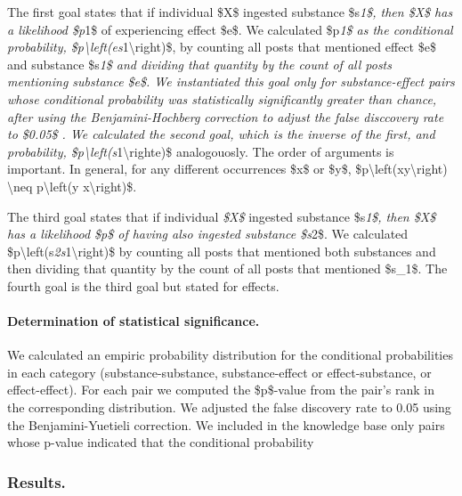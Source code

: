 \documentclass[
]{article}
\begin{document}
The first goal states that if individual \$X\$ ingested substance
\$s\emph{1\$, then \$X\$ has a likelihood \$p}1\$ of experiencing effect
\$e\$. We calculated \$p\emph{1\$ as the conditional probability,
\$p\textbackslash left(e\textbar s}1\textbackslash right)\$, by counting
all posts that mentioned effect \$e\$ and substance \$s\emph{1\$ and
dividing that quantity by the count of all posts mentioning substance
\$e\$. We instantiated this goal only for substance-effect pairs whose
conditional probability was statistically significantly greater than
chance, after using the Benjamini-Hochberg correction to adjust the
false disccovery rate to \$0.05\$ . We calculated the second goal, which
is the inverse of the first, and probability,
\$p\textbackslash left(s}1\textbackslash right\textbar e)\$
analogouosly. The order of arguments is important. In general, for any
different occurrences \$x\$ or \$y\$,
\$p\textbackslash left(x\textbar y\textbackslash right)
\textbackslash neq p\textbackslash left(y \textbar{}
x\textbackslash right)\$.

The third goal states that if individual \emph{\$X\$} ingested substance
\$s\emph{1\$, then \$X\$ has a likelihood \$p\$ of having also ingested
substance \$s}2\$. We calculated
\$p\textbackslash left(s\emph{2\textbar s}1\textbackslash right)\$ by
counting all posts that mentioned both substances and then dividing that
quantity by the count of all posts that mentioned \$s\_1\$. The fourth
goal is the third goal but stated for effects.

\hypertarget{header-n23}{%
\paragraph{\texorpdfstring{Determination of statistical significance.
}{Determination of statistical significance. }}\label{header-n23}}

We calculated an empiric probability distribution for the conditional
probabilities in each category (substance-substance, substance-effect or
effect-substance, or effect-effect). For each pair we computed the
\$p\$-value from the pair's rank in the corresponding distribution. We
adjusted the false discovery rate to 0.05 using the Benjamini-Yuetieli
correction. We included in the knowledge base only pairs whose p-value
indicated that the conditional probability

\hypertarget{header-n27}{%
\subsubsection{\texorpdfstring{Results. }{Results. }}\label{header-n27}}
\end{document}
